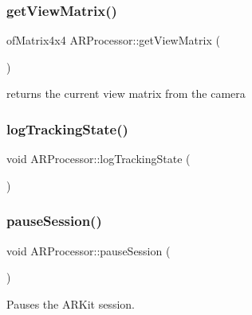 \mbox{\label{class_a_r_processor_a2e1d4cde9029bad28ac797c94e73096a}} 
\subsubsection{\texorpdfstring{get\+View\+Matrix()}{getViewMatrix()}}
{\footnotesize\ttfamily of\+Matrix4x4 A\+R\+Processor\+::get\+View\+Matrix (\begin{DoxyParamCaption}{ }\end{DoxyParamCaption})\hspace{0.3cm}{\ttfamily [inline]}}



returns the current view matrix from the camera 

\mbox{\label{class_a_r_processor_a3ae7b56c7d5f555ec84dbd1f1f0a8f65}} 
\subsubsection{\texorpdfstring{log\+Tracking\+State()}{logTrackingState()}}
{\footnotesize\ttfamily void A\+R\+Processor\+::log\+Tracking\+State (\begin{DoxyParamCaption}{ }\end{DoxyParamCaption})}

\mbox{\label{class_a_r_processor_a035d352220785ee03e1bb15ba6bf688d}} 
\subsubsection{\texorpdfstring{pause\+Session()}{pauseSession()}}
{\footnotesize\ttfamily void A\+R\+Processor\+::pause\+Session (\begin{DoxyParamCaption}{ }\end{DoxyParamCaption})}



Pauses the A\+R\+Kit session. 


